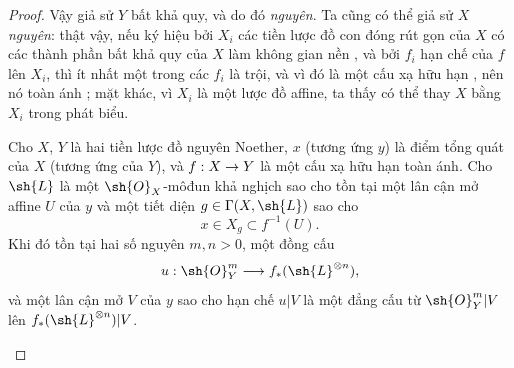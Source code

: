 \documentclass[oneside,10pt]{amsart}
\makeatletter
\newcommand{\ega@arrow}[2]{\mathchoice{#1}{#2}{#2}{#2}}
\renewcommand{\to}{\ega@arrow{\longrightarrow}{\rightarrow}}
\newcommand{\oldpage}[2][]{\marginnote{\normalfont\footnotesize\textbf{#1}~|~#2}\ignorespaces}
\let\EGAOriginalLabel\label
\renewcommand{\label}[1]{\phantomsection\EGAOriginalLabel{#1}}
\makeatother
\begin{document}
\begin{proof}
Vậy giả sử $Y$ bất khả quy, và do đó \emph{nguyên}.
Ta cũng có thể giả sử $X$ \emph{nguyên}:
thật vậy, nếu ký hiệu bởi $X_i$ các tiền lược đồ con đóng rút gọn của $X$ có các thành phần bất khả quy của $X$ làm không gian nền , và bởi $f_i$ hạn chế của $f$ lên $X_i$, thì ít nhất một trong các $f_i$ là trội, và vì đó là một cấu xạ hữu hạn , nên nó toàn ánh ;
mặt khác, vì $X_i$ là một lược đồ affine, ta thấy có thể thay $X$ bằng $X_i$ trong phát biểu.

\begin{lemma}[6.7.1.1]
\label{II.6.7.1.1}
Cho $X$, $Y$ là hai tiền lược đồ nguyên Noether, $x$ (tương ứng $y$) là điểm tổng quát của $X$ (tương ứng của $Y$), và $f:X\to Y$ là một cấu xạ hữu hạn toàn ánh.
Cho $\sh{L}$ là một $\sh{O}_X$-môđun khả nghịch sao cho tồn tại một lân cận mở affine $U$ của $y$ và một tiết diện $g\in\Gamma(X,\sh{L})$ sao cho
\oldpage[II]{137}
\[
  x\in X_g\subset f^{-1}(U).
\]
Khi đó tồn tại hai số nguyên $m,n>0$, một đồng cấu
\[
  u:\sh{O}_Y^m\to f_*(\sh{L}^{\otimes n}),
\]
và một lân cận mở $V$ của $y$ sao cho hạn chế $u|V$ là một đẳng cấu từ $\sh{O}_Y^m|V$ lên $f_*(\sh{L}^{\otimes n})|V$.
\end{lemma}


\end{proof}
\end{document}
